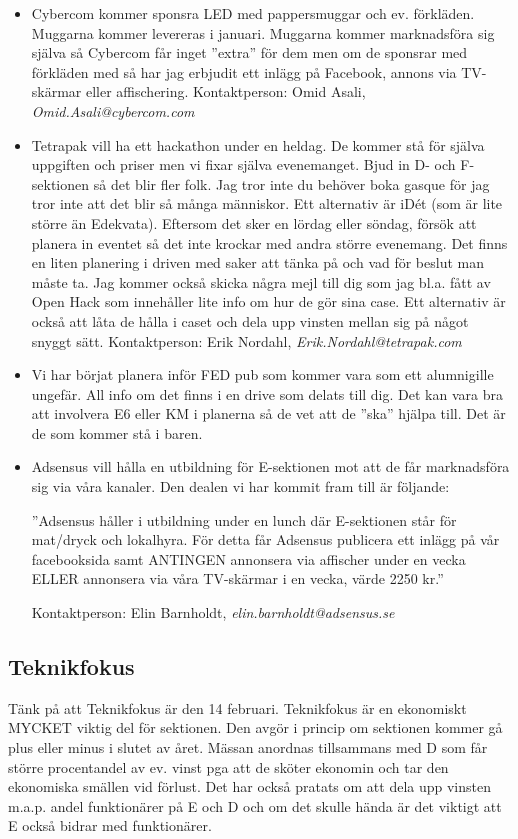 \documentclass[10pt]{article}
\begin{document}
\begin{itemize}
\item Cybercom kommer sponsra LED med pappersmuggar och ev. förkläden. Muggarna kommer levereras i januari. Muggarna kommer marknadsföra sig själva så Cybercom får inget ''extra'' för dem men om de sponsrar med förkläden med så har jag erbjudit ett inlägg på Facebook, annons via TV-skärmar eller affischering. Kontaktperson: Omid Asali, \textit{Omid.Asali@cybercom.com}

\item Tetrapak vill ha ett hackathon under en heldag. De kommer stå för själva uppgiften och priser men vi fixar själva evenemanget. Bjud in D- och F-sektionen så det blir fler folk. Jag tror inte du behöver boka gasque för jag tror inte att det blir så många människor. Ett alternativ är iDét (som är lite större än Edekvata). Eftersom det sker en lördag eller söndag, försök att planera in eventet så det inte krockar med andra större evenemang. Det finns en liten planering i driven med saker att tänka på och vad för beslut man måste ta. Jag kommer också skicka några mejl till dig som jag bl.a. fått av Open Hack som innehåller lite info om hur de gör sina case. Ett alternativ är också att låta de hålla i caset och dela upp vinsten mellan sig på något snyggt sätt. Kontaktperson: Erik Nordahl, \textit{Erik.Nordahl@tetrapak.com}

\item Vi har börjat planera inför FED pub som kommer vara som ett alumnigille ungefär. All info om det finns i en drive som delats till dig. Det kan vara bra att involvera E6 eller KM i planerna så de vet att de ''ska'' hjälpa till. Det är de som kommer stå i baren.

\item Adsensus vill hålla en utbildning för E-sektionen mot att de får marknadsföra sig via våra kanaler. Den dealen vi har kommit fram till är följande:

''Adsensus håller i utbildning under en lunch där E-sektionen står för mat/dryck och lokalhyra. För detta får Adsensus publicera ett inlägg på vår facebooksida samt ANTINGEN annonsera via affischer under en vecka ELLER annonsera via våra TV-skärmar i en vecka, värde 2250 kr.''

Kontaktperson: Elin Barnholdt, \textit{elin.barnholdt@adsensus.se}
\end{itemize}

\subsection*{Teknikfokus}
Tänk på att Teknikfokus är den 14 februari. Teknikfokus är en ekonomiskt MYCKET viktig del för sektionen. Den avgör i princip om sektionen kommer gå plus eller minus i slutet av året. Mässan anordnas tillsammans med D som får större procentandel av ev. vinst pga att de sköter ekonomin och tar den ekonomiska smällen vid förlust. Det har också pratats om att dela upp vinsten m.a.p. andel funktionärer på E och D och om det skulle hända är det viktigt att E också bidrar med funktionärer.
\end{document}
